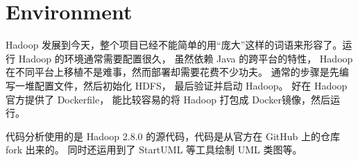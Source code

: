 \section{Environment}
\label{sec:environment}

Hadoop 发展到今天，整个项目已经不能简单的用“庞大”这样的词语来形容了。运行 Hadoop 的环境通常需要配置很久，
虽然依赖 Java 的跨平台的特性， Hadoop 在不同平台上移植不是难事，然而部署却需要花费不少功夫。
通常的步骤是先编写一堆配置文件，然后初始化 HDFS， 最后验证并启动 Hadoop。
好在 Hadoop 官方提供了 Dockerfile， 能比较容易的将 Hadoop 打包成 Docker镜像，然后运行。

代码分析使用的是 Hadoop 2.8.0 的源代码，代码是从官方在 GitHub 上的仓库 fork 出来的。
同时还运用到了 StartUML 等工具绘制 UML 类图等。

\endinput